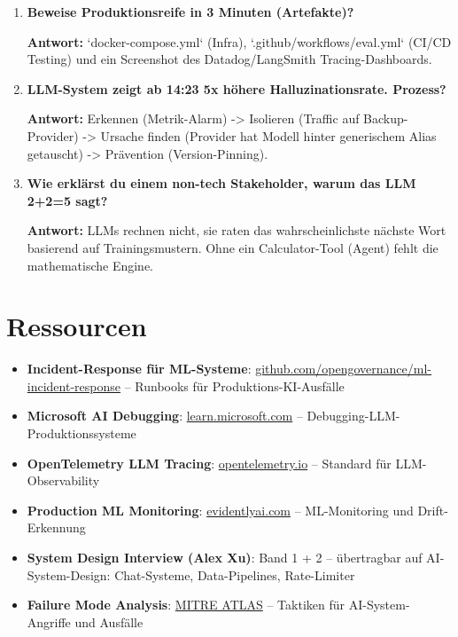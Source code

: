 \begin{enumerate}[leftmargin=*]
    \item \textbf{Beweise Produktionsreife in 3 Minuten (Artefakte)?}

    \textbf{Antwort:} `docker-compose.yml` (Infra), `.github/workflows/eval.yml` (CI/CD Testing) und ein Screenshot des Datadog/LangSmith Tracing-Dashboards.

    \item \textbf{LLM-System zeigt ab 14:23 5x höhere Halluzinationsrate. Prozess?}

    \textbf{Antwort:} Erkennen (Metrik-Alarm) -> Isolieren (Traffic auf Backup-Provider) -> Ursache finden (Provider hat Modell hinter generischem Alias getauscht) -> Prävention (Version-Pinning).

    \item \textbf{Wie erklärst du einem non-tech Stakeholder, warum das LLM 2+2=5 sagt?}

    \textbf{Antwort:} LLMs rechnen nicht, sie raten das wahrscheinlichste nächste Wort basierend auf Trainingsmustern. Ohne ein Calculator-Tool (Agent) fehlt die mathematische Engine.


\end{enumerate}


\section{Ressourcen}

\begin{itemize}[leftmargin=*]
    \item \textbf{Incident-Response für ML-Systeme}: \href{https://github.com/opengovernance/ml-incident-response}{github.com/opengovernance/ml-incident-response} -- Runbooks für Produktions-KI-Ausfälle
    \item \textbf{Microsoft AI Debugging}: \href{https://learn.microsoft.com/en-us/azure/machine-learning/how-to-troubleshoot-llm}{learn.microsoft.com} -- Debugging-LLM-Produktionssysteme
    \item \textbf{OpenTelemetry LLM Tracing}: \href{https://opentelemetry.io/docs/specs/otel/overview/}{opentelemetry.io} -- Standard für LLM-Observability
    \item \textbf{Production ML Monitoring}: \href{https://www.evidentlyai.com/}{evidentlyai.com} -- ML-Monitoring und Drift-Erkennung
    \item \textbf{System Design Interview (Alex Xu)}: Band 1 + 2 -- übertragbar auf AI-System-Design: Chat-Systeme, Data-Pipelines, Rate-Limiter
    \item \textbf{Failure Mode Analysis}: \href{https://github.com/mitre/atlas}{MITRE ATLAS} -- Taktiken für AI-System-Angriffe und Ausfälle
\end{itemize}

